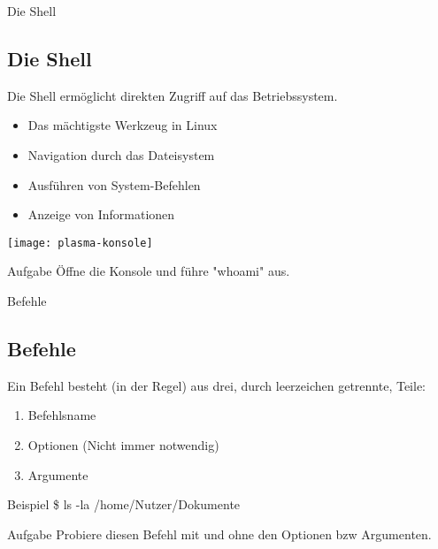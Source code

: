 \begin{frame}{Die Shell}
    \subsection{Die Shell}\label{subsec:die-shell}
    \pause
    Die Shell ermöglicht direkten Zugriff auf das Betriebssystem.
    \pause

    \begin{itemize}
        \item Das mächtigste Werkzeug in Linux\pause
        \item Navigation durch das Dateisystem\pause
        \item Ausführen von System-Befehlen\pause
        \item Anzeige von Informationen
    \end{itemize}
    \pause

    \vspace{0.5cm}
    \texttt{[image: plasma-konsole]}
    \pause

    \vspace{0.5cm}
    \begin{alertblock}{Aufgabe}
        Öffne die Konsole und führe "whoami" aus.
    \end{alertblock}

\end{frame}

\begin{frame}{Befehle}
    \subsection{Befehle}\label{subsec:befehle}
    \pause
    Ein Befehl besteht (in der Regel) aus drei, durch leerzeichen getrennte, Teile:
    \pause

    \begin{enumerate}
        \item Befehlsname\pause
        \item Optionen (Nicht immer notwendig)\pause
        \item Argumente
    \end{enumerate}
    \pause

    \vspace{0.5cm}
    \begin{exampleblock}{Beispiel}
        \$ ls -la /home/Nutzer/Dokumente
    \end{exampleblock}
    \pause

    \vspace{0.5cm}
    \begin{alertblock}{Aufgabe}
        Probiere diesen Befehl mit und ohne den Optionen bzw Argumenten.
    \end{alertblock}

\end{frame}

